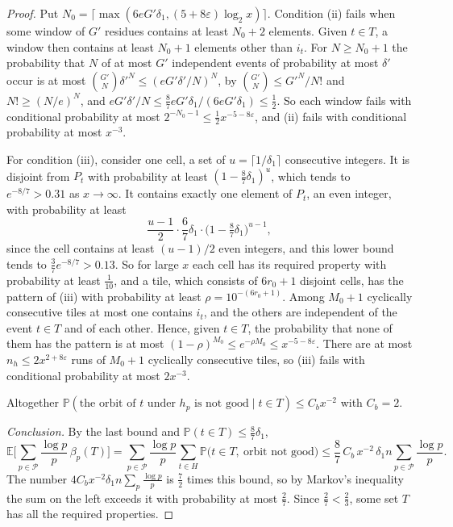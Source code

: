 \begin{proof}
Put $N_0=\lceil\max(6eG'\delta_1,(5+8\varepsilon)\log_2x)\rceil$. Condition (ii) fails when some window of $G'$ residues contains at least $N_0+2$ elements. Given $t\in T$, a window then contains at least $N_0+1$ elements other than $i_t$. For $N\ge N_0+1$ the probability that $N$ of at most $G'$ independent events of probability at most $\delta'$ occur is at most $\binom{G'}N\delta'^N\le(eG'\delta'/N)^N$, by $\binom{G'}N\le G'^N/N!$ and $N!\ge(N/e)^N$, and $eG'\delta'/N\le\frac87eG'\delta_1/(6eG'\delta_1)\le\frac12$. So each window fails with conditional probability at most $2^{-N_0-1}\le\frac12x^{-5-8\varepsilon}$, and (ii) fails with conditional probability at most $x^{-3}$.

For condition (iii), consider one cell, a set of $u=\lceil1/\delta_1\rceil$ consecutive integers. It is disjoint from $P_t$ with probability at least $(1-\frac87\delta_1)^u$, which tends to $e^{-8/7}>0.31$ as $x\to\infty$. It contains exactly one element of $P_t$, an even integer, with probability at least
\[
\frac{u-1}2\cdot\frac67\delta_1\cdot\big(1-\tfrac87\delta_1\big)^{u-1},
\]
since the cell contains at least $(u-1)/2$ even integers, and this lower bound tends to $\frac37e^{-8/7}>0.13$. So for large $x$ each cell has its required property with probability at least $\frac1{10}$, and a tile, which consists of $6r_0+1$ disjoint cells, has the pattern of (iii) with probability at least $\rho=10^{-(6r_0+1)}$. Among $M_0+1$ cyclically consecutive tiles at most one contains $i_t$, and the others are independent of the event $t\in T$ and of each other. Hence, given $t\in T$, the probability that none of them has the pattern is at most $(1-\rho)^{M_0}\le e^{-\rho M_0}\le x^{-5-8\varepsilon}$. There are at most $n_h\le2x^{2+8\varepsilon}$ runs of $M_0+1$ cyclically consecutive tiles, so (iii) fails with conditional probability at most $2x^{-3}$.

Altogether $\mathbb P(\text{the orbit of }t\text{ under }h_p\text{ is not good}\mid t\in T)\le C_bx^{-2}$ with $C_b=2$.

\emph{Conclusion.} By the last bound and $\mathbb P(t\in T)\le\frac87\delta_1$,
\[
\mathbb E\Big[\sum_{p\in\mathcal P}\frac{\log p}p\,\beta_p(T)\Big]=\sum_{p\in\mathcal P}\frac{\log p}p\sum_{t\in H}\mathbb P\big(t\in T,\ \text{orbit not good}\big)\le\frac87\,C_b\,x^{-2}\,\delta_1n\sum_{p\in\mathcal P}\frac{\log p}p .
\]
The number $4C_bx^{-2}\delta_1n\sum_p\frac{\log p}p$ is $\frac72$ times this bound, so by Markov's inequality the sum on the left exceeds it with probability at most $\frac27$. Since $\frac27<\frac23$, some set $T$ has all the required properties.
\end{proof}

